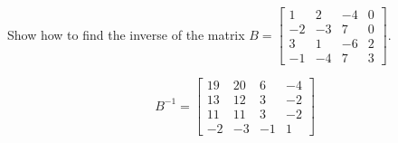 
\begin{exerciseStatement}


Show how to find the inverse of the matrix \(B= \left[\begin{array}{cccc}
1 & 2 & -4 & 0 \\
-2 & -3 & 7 & 0 \\
3 & 1 & -6 & 2 \\
-1 & -4 & 7 & 3
\end{array}\right] \).


\end{exerciseStatement}
    
\begin{exerciseAnswer} 
\[B^{-1}= \left[\begin{array}{cccc}
19 & 20 & 6 & -4 \\
13 & 12 & 3 & -2 \\
11 & 11 & 3 & -2 \\
-2 & -3 & -1 & 1
\end{array}\right] \]
\end{exerciseAnswer}
    

